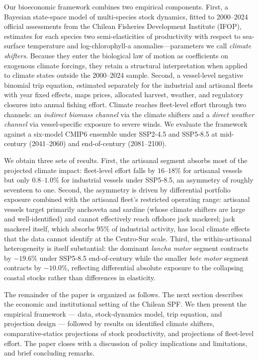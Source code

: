 \documentclass[
  11pt,
]{article}
\begin{document}
Our bioeconomic framework combines two empirical components. First, a Bayesian state-space model of multi-species stock dynamics, fitted to 2000--2024 official assessments from the Chilean Fisheries Development Institute (IFOP), estimates for each species two semi-elasticities of productivity with respect to sea-surface temperature and log-chlorophyll-a anomalies---parameters we call \emph{climate shifters}. Because they enter the biological law of motion as coefficients on exogenous climate forcings, they retain a structural interpretation when applied to climate states outside the 2000--2024 sample. Second, a vessel-level negative binomial trip equation, estimated separately for the industrial and artisanal fleets with year fixed effects, maps prices, allocated harvest, weather, and regulatory closures into annual fishing effort. Climate reaches fleet-level effort through two channels: an \emph{indirect biomass channel} via the climate shifters and a \emph{direct weather channel} via vessel-specific exposure to severe winds. We evaluate the framework against a six-model CMIP6 ensemble under SSP2-4.5 and SSP5-8.5 at mid-century (2041--2060) and end-of-century (2081--2100).

We obtain three sets of results. First, the artisanal segment absorbs most of the projected climate impact: fleet-level effort falls by \(16\)--\(18\%\) for artisanal vessels but only \(0.8\)--\(1.0\%\) for industrial vessels under SSP5-8.5, an asymmetry of roughly seventeen to one. Second, the asymmetry is driven by differential portfolio exposure combined with the artisanal fleet's restricted operating range: artisanal vessels target primarily anchoveta and sardine (whose climate shifters are large and well-identified) and cannot effectively reach offshore jack mackerel; jack mackerel itself, which absorbs \(95\%\) of industrial activity, has local climate effects that the data cannot identify at the Centro-Sur scale. Third, the within-artisanal heterogeneity is itself substantial: the dominant \emph{lancha motor} segment contracts by \(-19.6\%\) under SSP5-8.5 end-of-century while the smaller \emph{bote motor} segment contracts by \(-10.0\%\), reflecting differential absolute exposure to the collapsing coastal stocks rather than differences in elasticity.

The remainder of the paper is organized as follows. The next section describes the economic and institutional setting of the Chilean SPF. We then present the empirical framework --- data, stock-dynamics model, trip equation, and projection design --- followed by results on identified climate shifters, comparative-statics projections of stock productivity, and projections of fleet-level effort. The paper closes with a discussion of policy implications and limitations, and brief concluding remarks.
\end{document}
